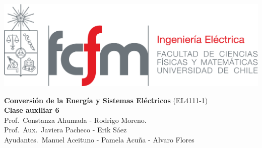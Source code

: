 \documentclass[
  11pt,
  letterpaper,
   addpoints,
   answers
  ]{exam}
\begin{document}
\noindent
\begin{minipage}{0.47\textwidth}
\includegraphics[width=\textwidth]{../fcfm_die}
\end{minipage}
\begin{minipage}{0.53\textwidth}
\begin{center} 
\large\textbf{Conversión de la Energía y Sistemas Eléctricos } (EL4111-1) \\
\large\textbf{Clase auxiliar 6} \\
\small Prof.~Constanza Ahumada - Rodrigo Moreno.\\
\small Prof.~Aux.~Javiera Pacheco - Erik Sáez\\
\small Ayudantes.~Manuel Aceituno - Pamela Acuña - Alvaro Flores\\
\end{center}
\end{minipage}

\vspace{0.5cm}
\noindent
\vspace{.85cm}
\end{document}
